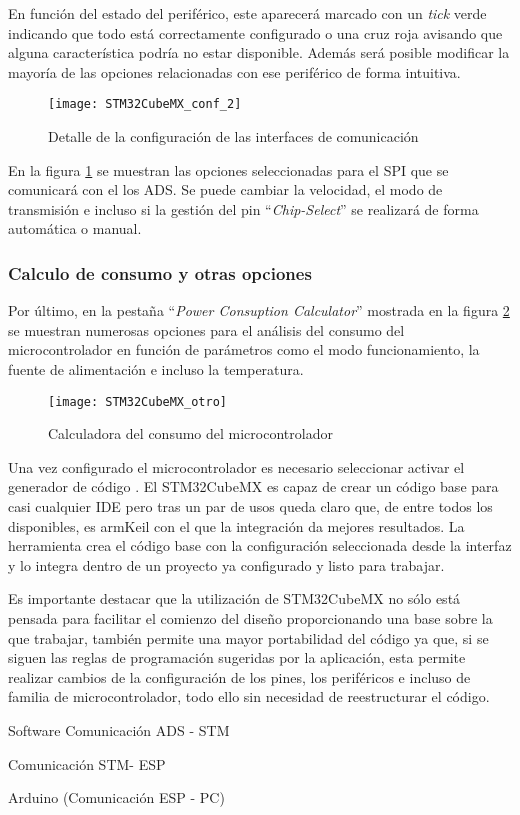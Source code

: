 En función del estado del periférico, este aparecerá marcado con un \textit{tick} verde indicando que todo está correctamente configurado o una cruz roja avisando que alguna característica podría no estar disponible. Además será posible modificar la mayoría de las opciones relacionadas con ese periférico de forma intuitiva. 

\begin{figure} [h]
    \centering
    \texttt{[image: STM32CubeMX\_conf\_2]}
    \caption{Detalle de la configuración de las interfaces de comunicación}
    \label{fig:STM32CubeMX_conf_2}
\end{figure}

En la figura \ref{fig:STM32CubeMX_conf_2} se muestran las opciones seleccionadas para el SPI que se comunicará con el los ADS. Se puede cambiar la velocidad, el modo de transmisión e incluso si la gestión del pin ``\textit{Chip-Select}'' se realizará de forma automática o manual.

\subsubsection{Calculo de consumo y otras opciones\label{Configuracion_micro_otro}}

Por último, en la pestaña ``\textit{Power Consuption Calculator}'' mostrada en la figura \ref{fig:STM32CubeMX_otro} se muestran numerosas opciones para el análisis del consumo del microcontrolador en función de parámetros como el modo funcionamiento, la fuente de alimentación e incluso la temperatura.

\begin{figure} [h]
    \centering
    \texttt{[image: STM32CubeMX\_otro]}
    \caption{Calculadora del consumo del microcontrolador}
    \label{fig:STM32CubeMX_otro}
\end{figure}

Una vez configurado el microcontrolador es necesario seleccionar  activar el generador de código . El STM32CubeMX es capaz de crear un código base para casi cualquier \acrshort{IDE} pero tras un par de usos queda claro que, de entre todos los disponibles, es armKeil con el que la integración da mejores resultados. La herramienta crea el código base con la configuración seleccionada desde la interfaz y lo integra dentro de un proyecto ya configurado y listo para trabajar.

Es importante destacar que la utilización de STM32CubeMX no sólo está pensada para facilitar el comienzo del diseño proporcionando una base sobre la que trabajar, también permite una mayor portabilidad del código ya que, si se siguen las reglas de programación sugeridas por la aplicación, esta permite realizar cambios de la configuración de los pines, los periféricos e incluso de familia de microcontrolador, todo ello sin necesidad de reestructurar el código.

Software
	Comunicación ADS - STM
	
	Comunicación STM- ESP
	
	Arduino (Comunicación ESP - PC)
	
	

